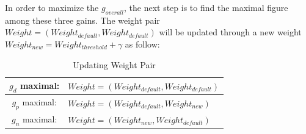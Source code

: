 In order to maximize the $g_{overall}$, the next step is to find the maximal figure among these three gains. The weight pair $Weight=\left(Weight_{default}, Weight_{default}\right)$ will be updated through a new weight $Weight_{new}=Weight_{threshold}+\gamma$ as follow:
\begin{table}[h]
    \centering
    \begin{tabular}{|c|l|}
    \hline
    $g_d$ maximal: & $Weight=\left(Weight_{default}, Weight_{default}\right)$ \\ \hline
    $g_p$ maximal: & $Weight=\left(Weight_{default}, Weight_{new}\right)$     \\ \hline
    $g_n$ maximal: & $Weight=\left(Weight_{new}, Weight_{default}\right)$     \\ \hline
    \end{tabular}
    \caption{Updating Weight Pair}
    \label{tab5}
\end{table}

